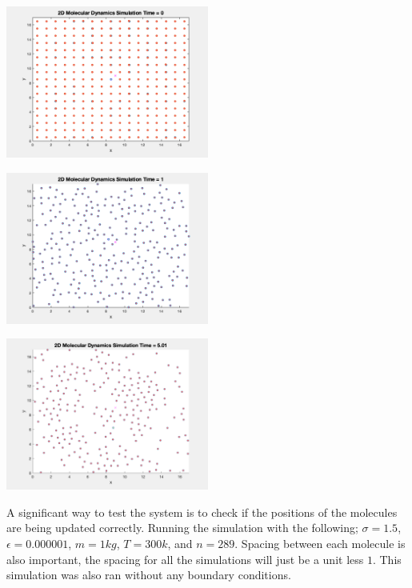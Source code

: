 \documentclass[reprint,amsmath,amssymb, aps, 10pt, a4paper, english, reqno]{revtex4-1}
\begin{document}
\begin{multicols}{2}
\begin{center}
    \includegraphics[width=0.50\textwidth]{position_n_289_t_0.png}
    \caption{\small FIG 2: Initial molecule positions}
\end{center}

\begin{center}
    \includegraphics[width=0.50\textwidth]{position_n_289_t_1.png}
    \caption{\small FIG 3: Molecule positions after $t = 1$.}
\end{center}

\begin{center}
    \includegraphics[width=0.50\textwidth]{position_n_289_t_5.01.png}
    \caption{\small FIG 4: Molecule positions after $t = 5$.}
\end{center}

A significant way to test the system is to check if the positions of the molecules are being updated correctly. Running the simulation with the following; $\sigma = 1.5$, $\epsilon = 0.000001$, $m = 1kg$, $T = 300k$, and $n = 289$. Spacing between each molecule is also important, the spacing for all the simulations will just be a unit less $1$. This simulation was also ran without any boundary conditions. \\


\end{multicols}
\end{document}
